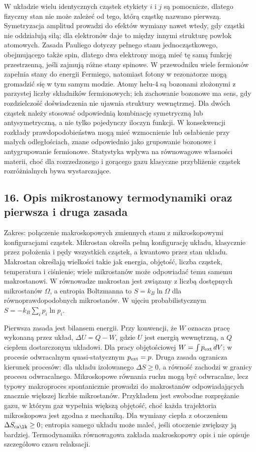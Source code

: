 \documentclass[11pt,a4paper]{article}
\begin{document}
W układzie wielu identycznych cząstek etykiety \(i\) i \(j\) są pomocnicze, dlatego fizyczny stan nie może zależeć od tego, którą cząstkę nazwano pierwszą. Symetryzacja amplitud prowadzi do efektów wymiany nawet wtedy, gdy cząstki nie oddziałują siłą; dla elektronów daje to między innymi strukturę powłok atomowych. Zasada Pauliego dotyczy pełnego stanu jednocząstkowego, obejmującego także spin, dlatego dwa elektrony mogą mieć tę samą funkcję przestrzenną, jeśli zajmują różne stany spinowe. W przewodniku wiele fermionów zapełnia stany do energii Fermiego, natomiast fotony w rezonatorze mogą gromadzić się w tym samym modzie. Atomy helu-4 są bozonami złożonymi z parzystej liczby składników fermionowych; ich zachowanie bozonowe ma sens, gdy rozdzielczość doświadczenia nie ujawnia struktury wewnętrznej. Dla dwóch cząstek należy stosować odpowiednią kombinację symetryczną lub antysymetryczną, a nie tylko pojedynczy iloczyn funkcji. W konsekwencji rozkłady prawdopodobieństwa mogą mieć wzmocnienie lub osłabienie przy małych odległościach, znane odpowiednio jako grupowanie bozonowe i antygrupowanie fermionowe. Statystyka wpływa na równowagowe własności materii, choć dla rozrzedzonego i gorącego gazu klasyczne przybliżenie cząstek rozróżnialnych bywa wystarczające.
\subsection{16. Opis mikrostanowy termodynamiki oraz pierwsza i druga zasada}
Zakres: połączenie makroskopowych zmiennych stanu z mikroskopowymi konfiguracjami cząstek. Mikrostan określa pełną konfigurację układu, klasycznie przez położenia i pędy wszystkich cząstek, a kwantowo przez stan układu. Makrostan określają wielkości takie jak energia, objętość, liczba cząstek, temperatura i ciśnienie; wiele mikrostanów może odpowiadać temu samemu makrostanowi. W równowadze makrostan jest związany z liczbą dostępnych mikrostanów \(\Omega\), a entropia Boltzmanna to \(S=k_B\ln\Omega\) dla równoprawdopodobnych mikrostanów. W ujęciu probabilistycznym \(S=-k_B\sum_i p_i\ln p_i\).

Pierwsza zasada jest bilansem energii. Przy konwencji, że \(W\) oznacza pracę wykonaną przez układ, \(\Delta U=Q-W\), gdzie \(U\) jest energią wewnętrzną, a \(Q\) ciepłem dostarczonym układowi. Dla pracy objętościowej \(W=\int p_{\rm ext}\,dV\); w procesie odwracalnym quasi-statycznym \(p_{\rm ext}=p\). Druga zasada ogranicza kierunek procesów: dla układu izolowanego \(\Delta S\geq0\), a równość zachodzi w granicy procesu odwracalnego. Mikroskopowe równania ruchu mogą być odwracalne, lecz typowy makroproces spontanicznie prowadzi do makrostanów odpowiadających znacznie większej liczbie mikrostanów. Przykładem jest swobodne rozprężanie gazu, w którym gaz wypełnia większą objętość, choć każda trajektoria mikroskopowa jest zgodna z mechaniką. Dla wymiany ciepła z otoczeniem \(\Delta S_{\rm całk}\geq0\); entropia samego układu może maleć, jeśli otoczenie zwiększy ją bardziej. Termodynamika równowagowa zakłada makroskopowy opis i nie opisuje szczegółowo czasu relaksacji.
\end{document}
